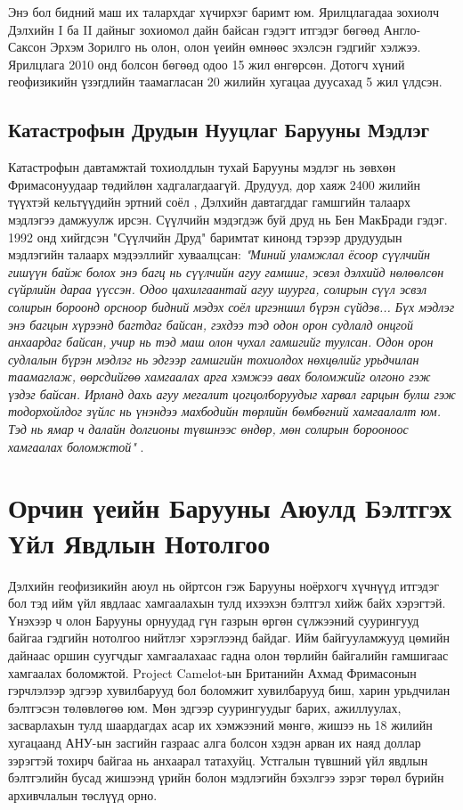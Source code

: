 \documentclass[10pt,twocolumn,letterpaper]{article}
\begin{document}
Энэ бол бидний маш их талархдаг хүчирхэг баримт юм. Ярилцлагадаа зохиолч Дэлхийн I ба II дайныг зохиомол дайн байсан гэдэгт итгэдэг бөгөөд Англо-Саксон Эрхэм Зорилго нь олон, олон үеийн өмнөөс эхэлсэн гэдгийг хэлжээ. Ярилцлага 2010 онд болсон бөгөөд одоо 15 жил өнгөрсөн. Дотогч хүний геофизикийн үзэгдлийн таамагласан 20 жилийн хугацаа дуусахад 5 жил үлдсэн.
\subsection{Катастрофын Друдын Нууцлаг Барууны Мэдлэг}

Катастрофын давтамжтай тохиолдлын тухай Барууны мэдлэг нь зөвхөн Фримасонуудаар төдийлөн хадгалагдаагүй. Друдууд, дор хаяж 2400 жилийн түүхтэй кельтүүдийн эртний соёл \cite{7}, Дэлхийн давтагддаг гамшгийн талаарх мэдлэгээ дамжуулж ирсэн. Сүүлчийн мэдэгдэж буй друд нь Бен МакБради гэдэг. 1992 онд хийгдсэн "Сүүлчийн Друд" баримтат кинонд тэрээр друдуудын мэдлэгийн талаарх мэдээллийг хуваалцсан: \textit{"Миний уламжлал ёсоор сүүлчийн гишүүн байж болох энэ багц нь сүүлчийн агуу гамшиг, эсвэл дэлхийд нөлөөлсөн сүйрлийн дараа үүссэн. Одоо цахилгаантай агуу шуурга, солирын сүүл эсвэл солирын бороонд орсноор бидний мэдэх соёл иргэншил бүрэн сүйдэв... Бүх мэдлэг энэ багцын хүрээнд багтдаг байсан, гэхдээ тэд одон орон судлалд онцгой анхаардаг байсан, учир нь тэд маш олон чухал гамшгийг туулсан. Одон орон судлалын бүрэн мэдлэг нь эдгээр гамшгийн тохиолдох нөхцөлийг урьдчилан таамаглаж, өөрсдийгөө хамгаалах арга хэмжээ авах боломжийг олгоно гэж үздэг байсан. Ирланд дахь агуу мегалит цогцолборуудыг харвал гарцын булш гэж тодорхойлдог зүйлс нь үнэндээ махбодийн төрлийн бөмбөгний хамгаалалт юм. Тэд нь ямар ч далайн долгионы түвшнээс өндөр, мөн солирын борооноос хамгаалах боломжтой"} \cite{8,9}.

\section{Орчин үеийн Барууны Аюулд Бэлтгэх Үйл Явдлын Нотолгоо}

Дэлхийн геофизикийн аюул нь ойртсон гэж Барууны ноёрхогч хүчнүүд итгэдэг бол тэд ийм үйл явдлаас хамгаалахын тулд ихээхэн бэлтгэл хийж байх хэрэгтэй. Үнэхээр ч олон Барууны орнуудад гүн газрын өргөн сүлжээний суурингууд байгаа гэдгийн нотолгоо нийтлэг хэрэглээнд байдаг. Ийм байгууламжууд цөмийн дайнаас оршин суугчдыг хамгаалахаас гадна олон төрлийн байгалийн гамшигаас хамгаалах боломжтой. Project Camelot-ын Британийн Ахмад Фримасонын гэрчлэлээр \cite{4,6} эдгээр хувилбарууд бол боломжит хувилбарууд биш, харин урьдчилан бэлтгэсэн төлөвлөгөө юм. Мөн эдгээр суурингуудыг барих, ажиллуулах, засварлахын тулд шаардагдах асар их хэмжээний мөнгө, жишээ нь 18 жилийн хугацаанд АНУ-ын засгийн газраас алга болсон хэдэн арван их наяд доллар \cite{11,12,13} зэрэгтэй тохирч байгаа нь анхаарал татахуйц. Устгалын түвшний үйл явдлын бэлтгэлийн бусад жишээнд үрийн болон мэдлэгийн бэхэлгээ зэрэг төрөл бүрийн архивчлалын төслүүд орно.
\end{document}
